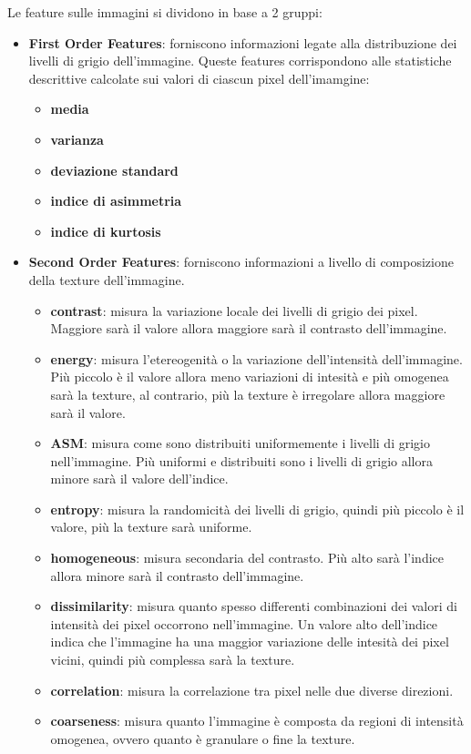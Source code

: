 Le feature sulle immagini si dividono in base a 2 gruppi\cite{explanation-features}:
\begin{itemize}
    \item \textbf{First Order Features}: forniscono informazioni legate alla
    distribuzione dei livelli di grigio dell'immagine. Queste features corrispondono
    alle statistiche descrittive calcolate sui valori di ciascun pixel dell'imamgine:
    \begin{itemize}
        \item \textbf{media}
        \item \textbf{varianza}
        \item \textbf{deviazione standard}
        \item \textbf{indice di asimmetria}
        \item \textbf{indice di kurtosis}
    \end{itemize}
    \item \textbf{Second Order Features}: forniscono informazioni a livello di 
    composizione della texture dell'immagine. 
    \begin{itemize}
        \item \textbf{contrast}: misura la variazione locale dei livelli di grigio 
        dei pixel. Maggiore sarà il valore allora maggiore sarà il contrasto dell'immagine.
        \item \textbf{energy}: misura l'etereogenità o la variazione dell'intensità
        dell'immagine. Più piccolo è il valore allora meno variazioni di intesità e
        più omogenea sarà la texture, al contrario, più la texture è irregolare 
        allora maggiore sarà il valore.
        \item \textbf{ASM}: misura come sono distribuiti uniformemente i livelli
        di grigio nell'immagine. Più uniformi e distribuiti sono i livelli di grigio
        allora minore sarà il valore dell'indice.
        \item \textbf{entropy}: misura la randomicità dei livelli di grigio, quindi
        più piccolo è il valore, più la texture sarà uniforme.
        \item \textbf{homogeneous}: misura secondaria del contrasto. Più alto sarà
        l'indice allora minore sarà il contrasto dell'immagine.
        \item \textbf{dissimilarity}: misura quanto spesso differenti combinazioni dei valori
        di intensità dei pixel occorrono nell'immagine. Un valore alto dell'indice 
        indica che l'immagine ha una maggior variazione delle intesità dei pixel vicini,
        quindi più complessa sarà la texture.
        \item \textbf{correlation}: misura la correlazione tra pixel nelle due diverse
        direzioni.
        \item \textbf{coarseness}: misura quanto l'immagine è composta da regioni 
        di intensità omogenea, ovvero quanto è granulare o fine la texture.
    \end{itemize}
\end{itemize}



